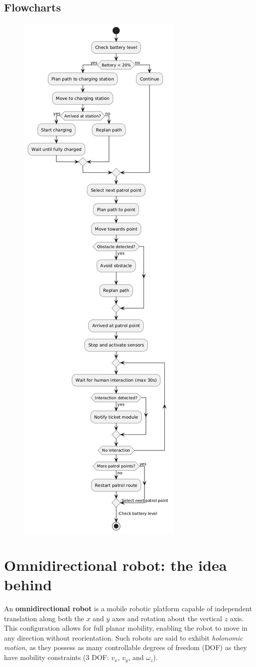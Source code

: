 \documentclass{article}
\begin{document}
\subsection{Flowcharts}
\begin{figure}[H]
    \centering
    \includegraphics[width=.35\linewidth]{photos/flowchart.jpeg}
\end{figure}


\newpage
\section{Omnidirectional robot: the idea behind} %
An \textbf{omnidirectional robot} is a mobile robotic platform capable of independent translation along both the $x$ and $y$ axes and rotation about the vertical $z$ axis. This configuration allows for full planar mobility, enabling the robot to move in any direction without reorientation. Such robots are said to exhibit \textit{holonomic motion}, as they possess as many controllable degrees of freedom (DOF) as they have mobility constraints (3 DOF: $v_x$, $v_y$, and $\omega_z$).
\end{document}
